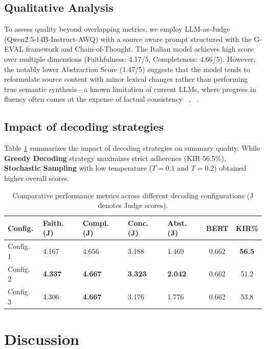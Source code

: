\documentclass[conference]{IEEEtran}
\begin{document}
\subsection{Qualitative Analysis}
To assess quality beyond overlapping metrics, we employ LLM-as-Judge (Qwen2.5-14B-Instruct-AWQ) with a source aware prompt structured with the G-EVAL framework  and Chain-of-Thought. The Italian model achieves high score over multiple dimensions (Faithfulness: 4.17/5, Completeness: 4.66/5). However, the notably lower Abstraction Score (1.47/5) suggests that the model tends to reformulate source content with minor lexical changes rather than performing true semantic synthesis—a known limitation of current LLMs, where progress in fluency often comes at the expense of factual consistency ~\cite{ladhak2022faithful}, ~\cite{tang2024faithfulness}.

\subsection{Impact of decoding strategies}
Table \ref{tab:results_summary} summarizes the impact of decoding strategies on summary quality. While \textbf{Greedy Decoding} strategy maximizes strict adherence (KIR  56.5\%), \textbf{Stochastic Sampling} with low temperature ($T=0.1$ and $T=0.2$) obtained higher overall scores. 

\begin{table}[h]
\caption{Comparative performance metrics across different decoding configurations (J denotes Judge scores).}
\label{tab:results_summary}
\centering
\small
\begin{tabularx}{\columnwidth}{lXXXXcc}
\toprule
\textbf{Config.} & \textbf{Faith. (J)} & \textbf{Compl. (J)} & \textbf{Conc. (J)} & \textbf{Abst. (J)} & \textbf{BERT} & \textbf{KIR\%} \\
\midrule
Config. 1 & 4.167 & 4.656 & 3.188 & 1.469 & 0.662 & \textbf{56.5} \\
Config. 2 & \textbf{4.337} & \textbf{4.667} & \textbf{3.323} & \textbf{2.042} & 0.662 & 51.2 \\
Config. 3 & 4.306 & \textbf{4.667} & 3.176 & 1.776 & 0.662 & 53.8 \\
\bottomrule
\end{tabularx}
\end{table}

\section{Discussion}
\end{document}
